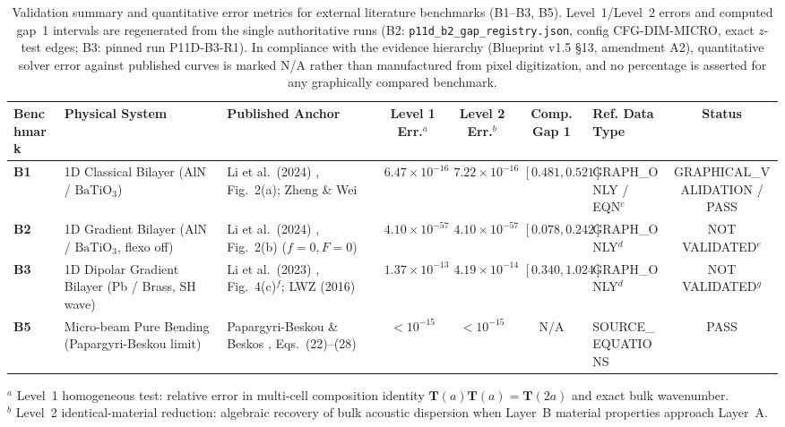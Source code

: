 \begin{table}[t]
\centering
\caption{Validation summary and quantitative error metrics for external literature benchmarks (B1--B3, B5). Level~1/Level~2 errors and computed gap~1 intervals are regenerated from the single authoritative runs (B2: \texttt{p11d\_b2\_gap\_registry.json}, config CFG-DIM-MICRO, exact $z$-test edges; B3: pinned run P11D-B3-R1). In compliance with the evidence hierarchy (Blueprint v1.5 \S13, amendment A2), quantitative solver error against published curves is marked N/A rather than manufactured from pixel digitization, and no percentage is asserted for any graphically compared benchmark.}
\label{tab:anchor_errors}
\footnotesize
\renewcommand{\arraystretch}{1.2}
\begin{tabular}{lp{3.2cm}p{2.8cm}cccp{2.5cm}c}
\hline\hline
\textbf{Benchmark} & \textbf{Physical System} & \textbf{Published Anchor} & \textbf{Level 1 Err.}$^a$ & \textbf{Level 2 Err.}$^b$ & \textbf{Comp. Gap 1} & \textbf{Ref. Data Type} & \textbf{Status} \\
\hline
\textbf{B1} & 1D Classical Bilayer (AlN / $\mathrm{BaTiO_3}$) & Li et al.\ (2024) \cite{li2024anchorB}, Fig.~2(a); Zheng \& Wei \cite{zhengwei2009} & $6.47 \times 10^{-16}$ & $7.22 \times 10^{-16}$ & $[0.481, 0.521]$ & GRAPH\_ONLY / EQN$^c$ & GRAPHICAL\_VALIDATION / PASS \\
\textbf{B2} & 1D Gradient Bilayer (AlN / $\mathrm{BaTiO_3}$, flexo off) & Li et al.\ (2024) \cite{li2024anchorB}, Fig.~2(b) ($f=0, F=0$) & $4.10 \times 10^{-57}$ & $4.10 \times 10^{-57}$ & $[0.078, 0.242]$ & GRAPH\_ONLY$^d$ & NOT VALIDATED$^e$ \\
\textbf{B3} & 1D Dipolar Gradient Bilayer (Pb / Brass, SH wave) & Li et al.\ (2023) \cite{li2023anchorA}, Fig.~4(c)$^f$; LWZ (2016) \cite{liweizhou2016} & $1.37 \times 10^{-13}$ & $4.19 \times 10^{-14}$ & $[0.340, 1.024]$ & GRAPH\_ONLY$^d$ & NOT VALIDATED$^g$ \\
\textbf{B5} & Micro-beam Pure Bending (Papargyri-Beskou limit) & Papargyri-Beskou \& Beskos \cite{papargyribeskou2009}, Eqs.~(22)--(28) & $< 10^{-15}$ & $< 10^{-15}$ & N/A & SOURCE\_EQUATIONS & PASS \\
\hline\hline
\end{tabular}
\begin{flushleft}
\scriptsize
$^a$ Level~1 homogeneous test: relative error in multi-cell composition identity $\mathbf{T}(a)\mathbf{T}(a) = \mathbf{T}(2a)$ and exact bulk wavenumber.\\
$^b$ Level~2 identical-material reduction: algebraic recovery of bulk acoustic dispersion when Layer~B material properties approach Layer~A.\\

\end{flushleft}
\end{table}
